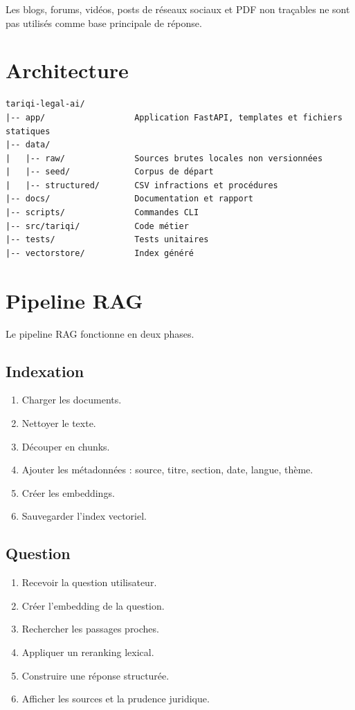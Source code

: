 \documentclass[12pt,a4paper]{article}
\begin{document}
Les blogs, forums, vidéos, posts de réseaux sociaux et PDF non traçables ne sont pas utilisés
comme base principale de réponse.

\section{Architecture}

\begin{lstlisting}
tariqi-legal-ai/
|-- app/                  Application FastAPI, templates et fichiers statiques
|-- data/
|   |-- raw/              Sources brutes locales non versionnées
|   |-- seed/             Corpus de départ
|   |-- structured/       CSV infractions et procédures
|-- docs/                 Documentation et rapport
|-- scripts/              Commandes CLI
|-- src/tariqi/           Code métier
|-- tests/                Tests unitaires
|-- vectorstore/          Index généré
\end{lstlisting}

\section{Pipeline RAG}

Le pipeline RAG fonctionne en deux phases.

\subsection{Indexation}

\begin{enumerate}[leftmargin=1.2cm]
    \item Charger les documents.
    \item Nettoyer le texte.
    \item Découper en chunks.
    \item Ajouter les métadonnées : source, titre, section, date, langue, thème.
    \item Créer les embeddings.
    \item Sauvegarder l'index vectoriel.
\end{enumerate}

\subsection{Question}

\begin{enumerate}[leftmargin=1.2cm]
    \item Recevoir la question utilisateur.
    \item Créer l'embedding de la question.
    \item Rechercher les passages proches.
    \item Appliquer un reranking lexical.
    \item Construire une réponse structurée.
    \item Afficher les sources et la prudence juridique.
\end{enumerate}
\end{document}
